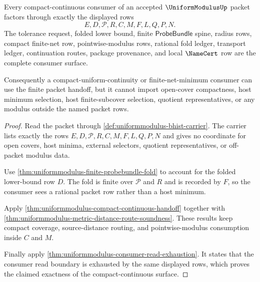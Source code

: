 \begin{theorem}
\label{thm:uniform-modulus-compact-continuous-consumer-exactness}
Every compact-continuous consumer of an accepted $\UniformModulusUp$ packet factors through exactly the displayed rows
$$
E,D,\mathcal{P},R,C,M,F,L,Q,P,N.
$$
The tolerance request, folded lower bound, finite $\mathsf{ProbeBundle}$ spine, radius rows, compact finite-net row, pointwise-modulus rows, rational fold ledger, transport ledger, continuation routes, package provenance, and local $\NameCert$ row are the complete consumer surface.

Consequently a compact-uniform-continuity or finite-net-minimum consumer can use the finite packet handoff, but it cannot import open-cover compactness, host minimum selection, host finite-subcover selection, quotient representatives, or any modulus outside the named packet rows.
\end{theorem}
\begin{proof}
Read the packet through \autoref{def:uniformmodulus-bhist-carrier}. The carrier lists exactly the rows $E,D,\mathcal{P},R,C,M,F,L,Q,P,N$ and gives no coordinate for open covers, host minima, external selectors, quotient representatives, or off-packet modulus data.

Use \autoref{thm:uniformmodulus-finite-probebundle-fold} to account for the folded lower-bound row $D$. The fold is finite over $\mathcal{P}$ and $R$ and is recorded by $F$, so the consumer sees a rational packet row rather than a host minimum.

Apply \autoref{thm:uniformmodulus-compact-continuous-handoff} together with \autoref{thm:uniformmodulus-metric-distance-route-soundness}. These results keep compact coverage, source-distance routing, and pointwise-modulus consumption inside $C$ and $M$.

Finally apply \autoref{thm:uniformmodulus-consumer-read-exhaustion}. It states that the consumer read boundary is exhausted by the same displayed rows, which proves the claimed exactness of the compact-continuous surface.
\end{proof}

